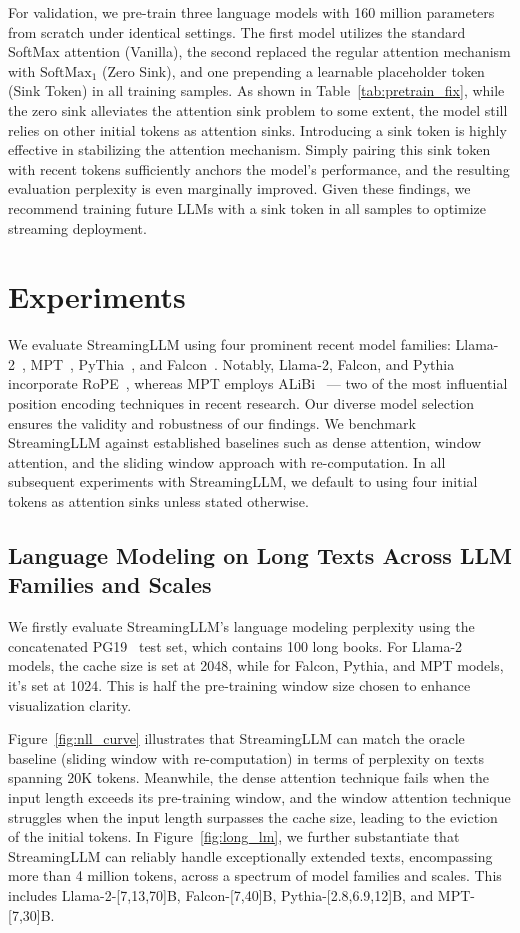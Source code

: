 For validation, we pre-train three language models with 160 million parameters from scratch under identical settings. The first model utilizes the standard SoftMax attention (Vanilla), the second replaced the regular attention mechanism with $\text{SoftMax}_1$ (Zero Sink), and one prepending a learnable placeholder token (Sink Token) in all training samples. As shown in Table~\ref{tab:pretrain_fix}, while the zero sink alleviates the attention sink problem to some extent, the model still relies on other initial tokens as attention sinks. Introducing a sink token is highly effective in stabilizing the attention mechanism. Simply pairing this sink token with recent tokens sufficiently anchors the model's performance, and the resulting evaluation perplexity is even marginally improved. Given these findings, we recommend training future LLMs with a sink token in all samples to optimize streaming deployment.

\section{Experiments}
\label{sec:exps}
We evaluate StreamingLLM using four prominent recent model families: Llama-2~\citep{touvron2023llama2}, MPT~\citep{MosaicML2023Introducing}, PyThia~\citep{biderman2023pythia}, and Falcon~\citep{falcon40b}. Notably, Llama-2, Falcon, and Pythia incorporate RoPE~\citep{su2021roformer}, whereas MPT employs ALiBi~\citep{alibi} — two of the most influential position encoding techniques in recent research. Our diverse model selection ensures the validity and robustness of our findings. We benchmark StreamingLLM against established baselines such as dense attention, window attention, and the sliding window approach with re-computation. In all subsequent experiments with StreamingLLM, we default to using four initial tokens as attention sinks unless stated otherwise.
\subsection{Language Modeling on Long Texts Across LLM Families and Scales} We firstly evaluate StreamingLLM's language modeling perplexity using the concatenated PG19~\citep{Rae2020Compressive} test set, which contains 100 long books. For Llama-2 models, the cache size is set at 2048, while for Falcon, Pythia, and MPT models, it's set at 1024. This is half the pre-training window size chosen to enhance visualization clarity.

Figure~\ref{fig:nll_curve} illustrates that StreamingLLM can match the oracle baseline (sliding window with re-computation) in terms of perplexity on texts spanning 20K tokens. Meanwhile, the dense attention technique fails when the input length exceeds its pre-training window, and the window attention technique struggles when the input length surpasses the cache size, leading to the eviction of the initial tokens. In Figure~\ref{fig:long_lm}, we further substantiate that StreamingLLM can reliably handle exceptionally extended texts, encompassing more than 4 million tokens, across a spectrum of model families and scales. This includes Llama-2-[7,13,70]B, Falcon-[7,40]B, Pythia-[2.8,6.9,12]B, and MPT-[7,30]B.

